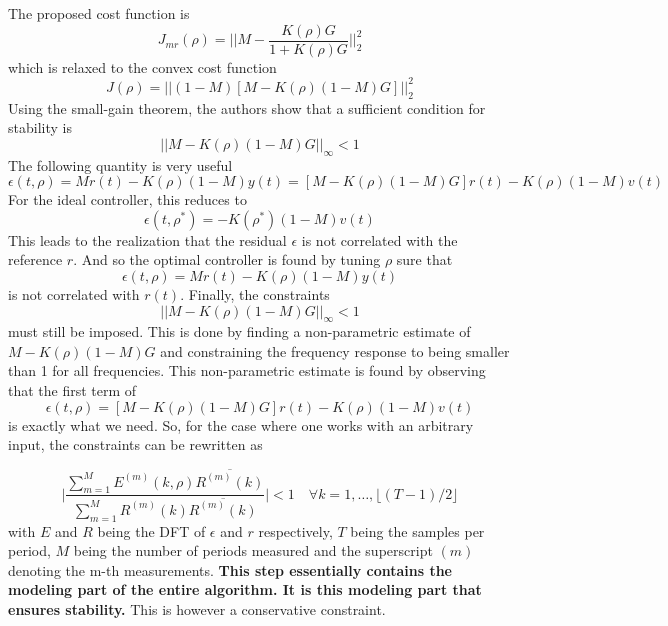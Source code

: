 The proposed cost function is
\begin{equation*}
    J_{mr}(\rho) = \Big|\Big|M-\frac{K(\rho)G}{1+K(\rho)G}\Big|\Big|_2^2
\end{equation*}
which is relaxed to the convex cost function
\begin{equation*}
    J(\rho) = \Big|\Big|(1-M)[M-K(\rho)(1-M)G]\Big|\Big|_2^2
\end{equation*}
Using the small-gain theorem, the authors show that a sufficient condition for stability is
\begin{equation*}
\Big|\Big|M-K(\rho)(1-M)G\Big|\Big|_\infty < 1
\end{equation*}
The following quantity is very useful
\begin{equation*}
    \epsilon(t,\rho) = M r(t) - K(\rho) (1-M) y(t) = [M-K(\rho)(1-M)G]r(t) - K(\rho) (1-M) v(t)
\end{equation*}
For the ideal controller, this reduces to
\begin{equation*}
    \epsilon(t,\rho^*) = - K(\rho^*) (1-M) v(t)
\end{equation*}
This leads to the realization that the residual $\epsilon$ is not correlated with the reference $r$. And so the optimal controller is found by tuning $\rho$ sure that
\begin{equation*}
    \epsilon(t,\rho) = M r(t) - K(\rho) (1-M) y(t)
\end{equation*}
is not correlated with $r(t)$. Finally, the constraints 
\begin{equation*}
\Big|\Big|M-K(\rho)(1-M)G\Big|\Big|_\infty < 1
\end{equation*}
must still be imposed. This is done by finding a non-parametric estimate of $M-K(\rho)(1-M)G$ and constraining the frequency response to being smaller than 1 for all frequencies. This non-parametric estimate is found by observing that the first term of
\begin{equation*}
    \epsilon(t,\rho) = [M-K(\rho)(1-M)G]r(t) - K(\rho) (1-M) v(t)
\end{equation*}
is exactly what we need. So, for the case where one works with an arbitrary input, the constraints can be rewritten as

\begin{equation*}
    \Big|\frac{\sum_{m=1}^M E^{(m)}(k,\rho) \overline{R^{(m)}(k)}}{\sum_{m=1}^M R^{(m)}(k) \overline{R^{(m)}(k)}}\Big| < 1 \quad \forall k = 1,\ldots,\lfloor (T-1)/2\rfloor
\end{equation*}
with $E$ and $R$ being the DFT of $\epsilon$ and $r$ respectively, $T$ being the samples per period, $M$ being the number of periods measured and the superscript $(m)$ denoting the m-th measurements. \textbf{This step essentially contains the modeling part of the entire algorithm. It is this modeling part that ensures stability.} This is however a conservative constraint.


